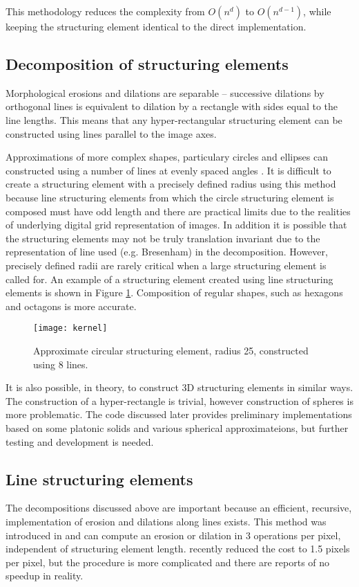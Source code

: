 \documentclass{InsightArticle}
\begin{document}
This methodology reduces the complexity from $O(n^d)$ to $O(n^{d-1})$,
while keeping the structuring element identical to the direct
implementation.

\subsection{Decomposition of structuring elements}
Morphological erosions and dilations are separable -- successive
dilations by orthogonal lines is equivalent to dilation by a rectangle
with sides equal to the line lengths. This means that any
hyper-rectangular structuring element can be constructed using lines
parallel to the image axes.

Approximations of more complex shapes, particulary circles and
ellipses can constructed using a number of lines at evenly spaced
angles \cite{Adams93}. It is difficult to create a structuring element
with a precisely defined radius using this method because line
structuring elements from which the circle structuring element is
composed must have odd length and there are practical limits due to
the realities of underlying digital grid representation of images. In
addition it is possible that the structuring elements may not be truly
translation invariant due to the representation of line used
(e.g. Bresenham) in the decomposition. However, precisely defined
radii are rarely critical when a large structuring element is called
for. An example of a structuring element created using line
structuring elements is shown in Figure \ref{fig:circledecomposition}. Composition of regular
shapes, such as hexagons and octagons is more accurate.

\begin{figure}[htbp]
\centering
\texttt{[image: kernel]}
\caption{Approximate circular structuring element, radius 25, constructed using 8 lines.\label{fig:circledecomposition}}
\end{figure}

It is also possible, in theory, to construct 3D structuring elements
in similar ways. The construction of a hyper-rectangle is trivial,
however construction of spheres is more problematic. The code
discussed later provides preliminary implementations based on some
platonic solids and various spherical approximateions, but further
testing and development is needed.

\subsection{Line structuring elements}
The decompositions discussed above are important because an efficient,
recursive, implementation of erosion and dilations along lines
exists. This method was introduced in \cite{Gil1993,vanHerk1992a} and
can compute an erosion or dilation in 3 operations per pixel,
independent of structuring element length. \cite{Gil2000} recently
reduced the cost to 1.5 pixels per pixel, but the procedure is more
complicated and there are reports of no speedup in reality.
\end{document}
